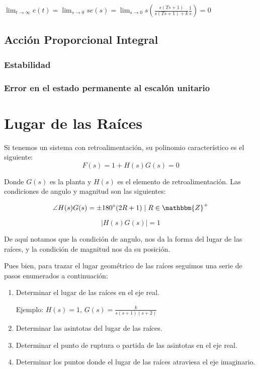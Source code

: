 \documentclass[12pt]{article}
\numberwithin{equation}{subsection}
\begin{document}
\begin{math}
\displaystyle \lim_{t \to \infty} e(t) = \lim_{s \to 0} s e(s) = \lim_{s \to 0} s \left(\frac{s(Ts + 1)}{s(Ts + 1) + k} \frac{1}{s}\right) = 0
\end{math}

\subsection{Acción Proporcional Integral}
\subsubsection{Estabilidad}
\subsubsection{Error en el estado permanente al escalón unitario}

\newpage
\section{Lugar de las Raíces}
Si tenemos un sistema con retroalimentación, su polinomio característico es el siguiente:
\begin{equation}
F(s) = 1 + H(s) G(s) = 0
\end{equation}

Donde $G(s)$ es la planta y $H(s)$ es el elemento de retroalimentación. Las condiciones de angulo y magnitud son las siguientes:

\begin{equation}
\angle H(s) G(s) = \pm 180^{\circ} (2R + 1) \mid R \in \mathbbm{Z}^+
\end{equation}

\begin{equation}
\lvert H(s) G(s) \rvert = 1
\end{equation}

De aquí notamos que la condición de angulo, nos da la forma del lugar de las raíces, y la condición de magnitud nos da su posición.

Pues bien, para trazar el lugar geométrico de las raíces seguimos una serie de pasos enumerados a continuación:

\begin{enumerate}
\item
Determinar el lugar de las raíces en el eje real.

Ejemplo: $H(s) = 1$, $G(s) = \frac{k}{s(s+1)(s+2)}$


\item
Determinar las asintotas del lugar de las raíces.
\item
Determinar el punto de ruptura o partida de las asintotas en el eje real.
\item
Determinar los puntos donde el lugar de las raíces atraviesa el eje imaginario.
\end{enumerate}
\end{document}
